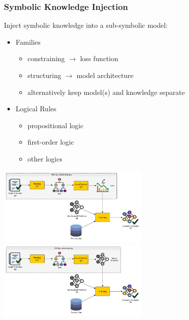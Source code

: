 \documentclass[presentation]{beamer}\mode<presentation>{\usetheme{blackAMSBolognaFC}}
\begin{document}
\begin{frame}[allowframebreaks]
\frametitle{Symbolic Knowledge Injection}

    \alert{Inject} symbolic knowledge into a sub-symbolic model:~
    \vspace{0.5cm}
    \begin{itemize}
        \item Families
        \begin{itemize}
            \item constraining $\rightarrow$ \alert{loss function}
            \item structuring $\rightarrow$ \alert{model architecture}
            \item alternatively keep model(s) and knowledge separate
        \end{itemize}

        \vfill

        \item Logical Rules
        \begin{itemize}
            \item propositional logic
            \item first-order logic
            \item other logics
        \end{itemize}

        \vfill
    \end{itemize}

    \framebreak
    \centering
    \includegraphics[width=0.55\textwidth]{figures/injection-constraining}
    \vfill
    \includegraphics[width=0.55\textwidth]{figures/injection-structuring}
    \vfill
        

\end{frame}
\end{document}
